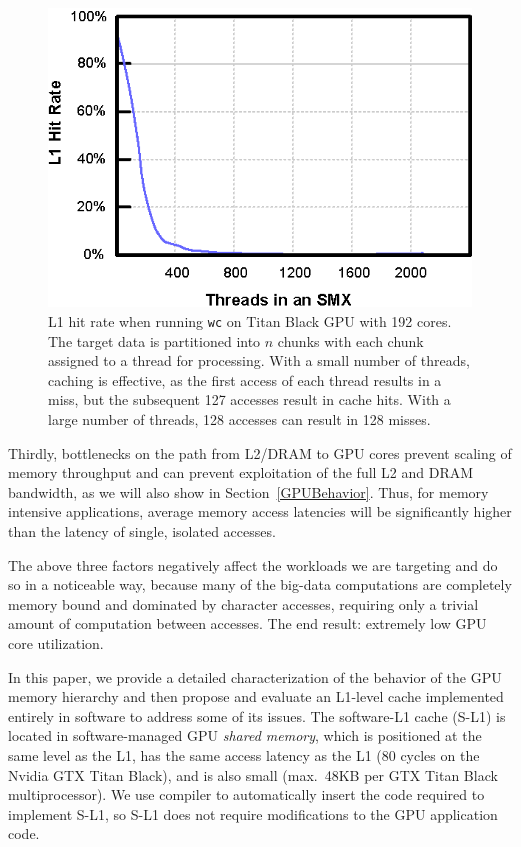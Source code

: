 \begin{figure}
\center
\includegraphics[scale=0.90]{WC-L1HitRate.eps}
\caption{\footnotesize\textnormal{L1 hit rate when running \texttt{wc} on Titan
Black GPU with 192 cores. The target data is partitioned into $n$ chunks with
each chunk assigned to a thread for processing. With a small number of threads, caching is effective, as the
first access of each thread results in a miss, but the subsequent 127 accesses
result in cache hits. With a large number of threads, 128 accesses can result in 128
misses.}} \label{fig:L1HitRate}
\end{figure}

Thirdly, bottlenecks on the path from L2/DRAM to GPU cores prevent scaling of memory throughput and can prevent exploitation of the full L2 and DRAM bandwidth, as we will also show in Section~\ref{GPUBehavior}.
Thus, for memory intensive applications, average memory access latencies will be significantly higher than the latency of single, isolated accesses.

The above three factors negatively affect the workloads we are targeting and do so in a noticeable way,
because many of the big-data computations are completely memory bound and dominated by character accesses, requiring only a
trivial amount of computation between accesses.
The end result: extremely low GPU core utilization.

In this paper, we provide a detailed characterization of the behavior of the GPU memory hierarchy and then propose and evaluate
an L1-level cache implemented entirely in software to address some of its issues. %
The software-L1 cache (S-L1) is located in software-managed GPU \emph{shared memory},
which is positioned at the same level as the L1, has the same access latency as the L1  (80 cycles on the Nvidia GTX Titan Black), and is also small (max.\ 48KB per GTX Titan Black multiprocessor).
We use compiler to automatically insert the code required to implement S-L1, so S-L1 does not require modifications to the GPU application code.

